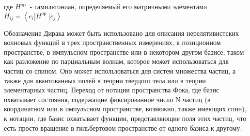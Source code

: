 \documentclass[main.tex]{subfiles}
\begin{document}
где $H^{\text {op }} $ - гамильтониан, определяемый его матричными элементами $H_{i j}=\left\langle e_{i}\left|H^{\text {op }}\right| e_{j}\right\rangle$

Обозначение Дирака может быть использовано для описания нерелятивистских волновых функций в трех пространственных измерениях, в позиционном пространстве, в импульсном пространстве или в некотором другом базисе, таком как разложение по парциальным волнам, которое может использоваться для частиц со спином. Оно может использоваться для систем множества частиц, а также для квантованных полей в теории твердого тела или в теории элементарных частиц. Переход от нотации пространства Фока, где базис охватывает состояния, содержащие фиксированное число N частиц (в координатном или в импульсном пространстве, возможно, также имеющих спин), к нотации, где базис охватывает функции, представляющие поля этих частиц, что есть просто вращение в гильбертовом пространстве от одного базиса к другому.
\end{document}
